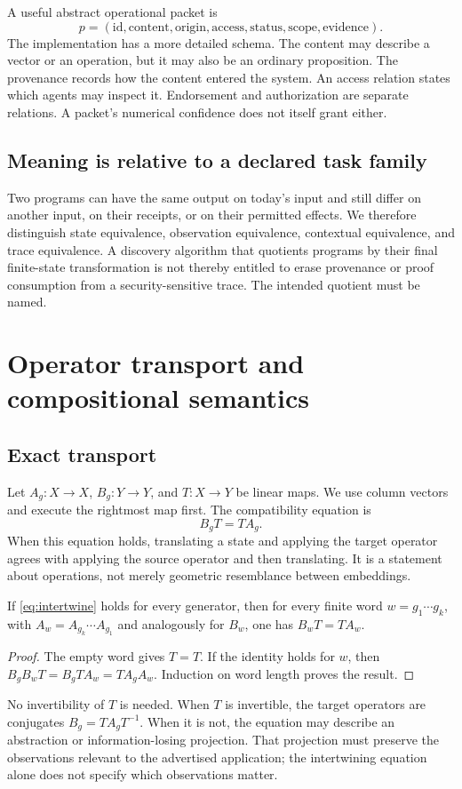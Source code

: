 \documentclass[11pt]{article}
\begin{document}
A useful abstract operational packet is
\[
 p=(\mathrm{id},\mathrm{content},\mathrm{origin},\mathrm{access},\mathrm{status},\mathrm{scope},\mathrm{evidence}).
\]
The implementation has a more detailed schema. The content may describe a vector or an operation, but it may also be an ordinary proposition. The provenance records how the content entered the system. An access relation states which agents may inspect it. Endorsement and authorization are separate relations. A packet's numerical confidence does not itself grant either.

\subsection{Meaning is relative to a declared task family}
Two programs can have the same output on today's input and still differ on another input, on their receipts, or on their permitted effects. We therefore distinguish state equivalence, observation equivalence, contextual equivalence, and trace equivalence. A discovery algorithm that quotients programs by their final finite-state transformation is not thereby entitled to erase provenance or proof consumption from a security-sensitive trace. The intended quotient must be named.

\section{Operator transport and compositional semantics}
\subsection{Exact transport}
Let \(A_g:X\to X\), \(B_g:Y\to Y\), and \(T:X\to Y\) be linear maps. We use column vectors and execute the rightmost map first. The compatibility equation is
\begin{equation}\label{eq:intertwine}
 B_gT=TA_g.
\end{equation}
When this equation holds, translating a state and applying the target operator agrees with applying the source operator and then translating. It is a statement about operations, not merely geometric resemblance between embeddings.

\begin{proposition}\label{prop:transport}
If \eqref{eq:intertwine} holds for every generator, then for every finite word \(w=g_1\cdots g_k\), with \(A_w=A_{g_k}\cdots A_{g_1}\) and analogously for \(B_w\), one has \(B_wT=TA_w\).
\end{proposition}
\begin{proof}
The empty word gives \(T=T\). If the identity holds for \(w\), then
\(B_gB_wT=B_gTA_w=TA_gA_w\). Induction on word length proves the result.
\end{proof}
No invertibility of \(T\) is needed. When \(T\) is invertible, the target operators are conjugates \(B_g=TA_gT^{-1}\). When it is not, the equation may describe an abstraction or information-losing projection. That projection must preserve the observations relevant to the advertised application; the intertwining equation alone does not specify which observations matter.
\end{document}
